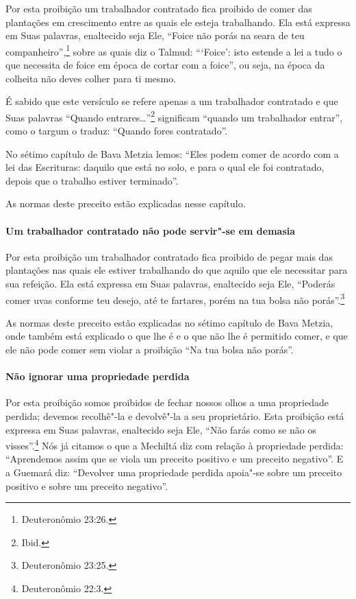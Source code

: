 \begin{multicols}{2}
Por esta proibição um trabalhador contratado fica proibido de comer das
plantações em crescimento entre as quais ele esteja trabalhando. Ela
está expressa em Suas palavras, enaltecido seja Ele, ``Foice não porás
na seara de teu companheiro'',\footnote{Deuteronômio 23:26.} sobre as quais diz o
Talmud\starr: ```Foice': isto estende a lei a tudo o que necessita de foice
em época de cortar com a foice'', ou seja, na época da colheita não
deves colher para ti mesmo.

É sabido que este versículo se refere apenas a um trabalhador contratado e que Suas palavras ``Quando entrares\ldots{}''\footnote{Ibid.} significam ``quando
um trabalhador entrar'', como o targum\starr{} o traduz: ``Quando fores
contratado''.

No sétimo capítulo de Bava Metzia\starr{} lemos: ``Eles podem comer de acordo
com a lei das Escrituras: daquilo que está no solo, e para o qual ele
foi contratado, depois que o trabalho estiver terminado''.

As normas deste preceito estão explicadas nesse capítulo.

\paragraph{Um trabalhador contratado não pode servir"-se em demasia}

Por esta proibição um trabalhador contratado fica proibido de pegar
mais das plantações nas quais ele estiver trabalhando do que aquilo que
ele necessitar para sua refeição. Ela está expressa em Suas palavras,
enaltecido seja Ele, ``Poderás comer uvas conforme teu desejo, até te
fartares, porém na tua bolsa não porás''.\footnote{Deuteronômio 23:25.}

As normas deste preceito estão explicadas no sétimo capítulo de Bava
Metzia\starr, onde também está explicado o que lhe é e o que não lhe é
permitido comer, e que ele não pode comer sem violar a proibição ``Na
tua bolsa não porás''.

\paragraph{Não ignorar uma propriedade perdida}

Por esta proibição somos proibidos de fechar nossos olhos a uma
propriedade perdida; devemos recolhê"-la e devolvê"-la a seu proprietário.
Esta proibição está expressa em Suas palavras, enaltecido seja Ele, ``Não
farás como se não os visses''.\footnote{Deuteronômio 22:3.} Nós já citamos o que
a Mechiltá\starr{} diz com relação à propriedade perdida: ``Aprendemos assim que
se viola um preceito positivo e um preceito negativo''. E a Guemará\starr{} diz:
``Devolver uma propriedade perdida apoia"-se sobre um preceito positivo e
sobre um preceito negativo''.


\end{multicols}
